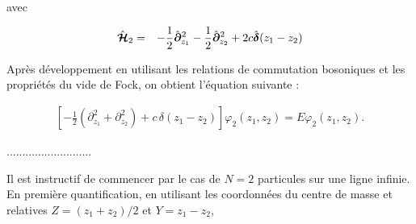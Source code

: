avec 

\begin{eqnarray}
	\hat{\bm{\mathcal{H}}}_2 & = &  - \frac{1}{2} \hat{\bm{\partial}}_{z_1}^2 - \frac{1}{2} \hat{\bm{\partial}}_{z_2}^2+ 2	c  \hat{\bm{\delta}}(z_1 - z_2) 		
\end{eqnarray}


Après développement en utilisant les relations de commutation bosoniques et les propriétés du vide de Fock, on obtient l’équation suivante :

\begin{eqnarray}
	\left[ -\frac{1}{2} (\partial_{z_1}^2 + \partial_{z_2}^2) + c\, \delta(z_1 - z_2) \right] \varphi_2(z_1, z_2) = E \varphi_2(z_1, z_2). \label{chap:eq.twobody}
\end{eqnarray}


...........................

Il est instructif de commencer par le cas de $N = 2$ particules sur une ligne infinie. En première quantification, en utilisant les coordonnées du centre de masse et relatives $Z = (z_1 + z_2)/2$ et $Y = z_1 - z_2$,

